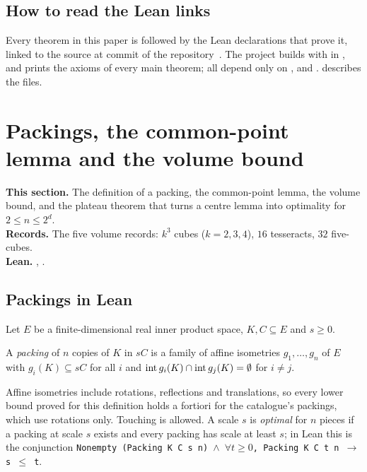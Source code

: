 \documentclass[11pt,a4paper]{article}
\begin{document}
\subsection{How to read the Lean links}
Every theorem in this paper is followed by the Lean declarations that prove it, linked to the source at commit \href{\repo/tree/\leancommit}{\texttt{\leancommitshort}} of the repository~\cite{archive}. The project builds with  in , and  prints the axioms of every main theorem; all depend only on ,  and .  describes the files.

\section{Packings, the common-point lemma and the volume bound}\label{sec:setting}

\begin{summarybox}
\textbf{This section.} The definition of a packing, the common-point lemma, the volume bound, and the plateau theorem that turns a centre lemma into optimality for $2\le n\le2^d$.\\
\textbf{Records.} The five volume records: $k^3$ cubes ($k=2,3,4$), $16$ tesseracts, $32$ five-cubes.\\
\textbf{Lean.} , .
\end{summarybox}

\subsection{Packings in Lean}
Let $E$ be a finite-dimensional real inner product space, $K,C\subseteq E$ and $s\ge 0$.

\begin{definition}
A \emph{packing} of $n$ copies of $K$ in $sC$ is a family of affine isometries $g_1,\dots,g_n$ of $E$ with $g_i(K)\subseteq sC$ for all $i$ and $\operatorname{int} g_i(K)\cap\operatorname{int} g_j(K)=\emptyset$ for $i\ne j$.
\end{definition}

Affine isometries include rotations, reflections and translations, so every lower bound proved for this definition holds a fortiori for the catalogue's packings, which use rotations only. Touching is allowed. A scale $s$ is \emph{optimal} for $n$ pieces if a packing at scale $s$ exists and every packing has scale at least $s$; in Lean this is the conjunction \texttt{Nonempty (Packing K C s n) $\wedge$ $\forall t\ge0$, Packing K C t n $\to$ s $\le$ t}.
\end{document}
